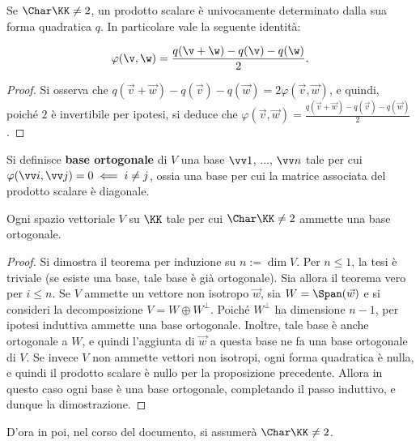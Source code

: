 \documentclass[11pt]{article}
\begin{document}
	\begin{proposition}
		Se $\Char \KK \neq 2$, un prodotto scalare è univocamente determinato dalla sua forma quadratica $q$.
		In particolare vale la seguente identità:
		
		\[ \varphi(\v, \w) = \frac{q(\v + \w) - q(\v) - q(\w)}{2}. \]
		
		\vskip 0.05in
	\end{proposition}

	\begin{proof}
		Si osserva che $q(\vec v + \vec w) - q(\vec v) - q(\vec w) = 2 \varphi(\vec v, \vec w)$, e quindi,
		poiché $2$ è invertibile per ipotesi, si deduce che $\varphi(\vec v, \vec w) = \frac{q(\vec v + \vec w) - q(\vec v) - q(\vec w)}{2}$.
	\end{proof}

	\begin{definition}
		Si definisce \textbf{base ortogonale} di $V$ una base $\vv 1$, ..., $\vv n$ tale per cui $\varphi(\vv i, \vv j) = 0
		\impliedby i \neq j$, ossia una base per cui la matrice associata del prodotto scalare è diagonale. 
	\end{definition}

	\begin{theorem}[di Lagrange]
		Ogni spazio vettoriale $V$ su $\KK$ tale per cui $\Char \KK \neq 2$ ammette una base ortogonale.
	\end{theorem}

	\begin{proof}
		Si dimostra il teorema per induzione su $n := \dim V$. Per $n \leq 1$, la tesi è triviale (se esiste una base, tale base è
		già ortogonale). Sia
		allora il teorema vero per $i \leq n$. Se $V$ ammette un vettore non isotropo $\vec w$, sia $W = \Span(\vec w)$ e si consideri la decomposizione $V = W \oplus W^\perp$. Poiché $W^\perp$ ha dimensione $n-1$, per ipotesi induttiva
		ammette una base ortogonale. Inoltre, tale base è anche ortogonale a $W$, e quindi l'aggiunta di $\vec w$ a
		questa base ne fa una base ortogonale di $V$. Se invece $V$ non ammette vettori non isotropi, ogni forma quadratica
		è nulla, e quindi il prodotto scalare è nullo per la proposizione precedente. Allora in questo caso
		ogni base è una base ortogonale, completando il passo induttivo, e dunque la dimostrazione.
	\end{proof}


	\begin{note}
		D'ora in poi, nel corso del documento, si assumerà $\Char \KK \neq 2$.
	\end{note}
\end{document}
